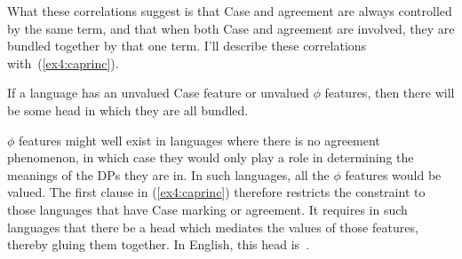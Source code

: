 What these correlations suggest is that Case and agreement are always controlled by the same term, and that when both Case and agreement are involved, they are bundled together by that one term. I'll describe these correlations with~(\ref{ex4:caprinc}).%
%
%
%
\begin{exe}
\ex \label{ex4:caprinc} If a language has an unvalued Case feature or unvalued $\phi$ features, then there will be some head in which they are all bundled.
\end{exe}
$\phi$ features might well exist in languages where there is no agreement phenomenon, in which case they would only play a role in determining the meanings of the DPs they are in. In such languages, all the $\phi$ features would be valued. The first clause in (\ref{ex4:caprinc}) therefore restricts the constraint to those languages that have Case marking or agreement. It requires in such languages that there be a head which mediates the values of those features, thereby gluing them together. In English, this head is~.

